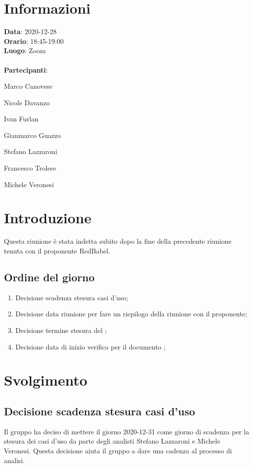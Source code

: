 \section{Informazioni}
\textbf{Data}: 2020-12-28\\
\textbf{Orario}: 18:45-19:00\\
\textbf{Luogo}: Zoom\\\\
\textbf{Partecipanti}:\begin{list}{*}{\setlength{\itemsep}{0cm}}
	\item Marco Canovese
	\item Nicole Davanzo
	\item Ivan Furlan
	\item Gianmarco Guazzo
	\item Stefano Lazzaroni
	\item Francesco Trolese
	\item Michele Veronesi
\end{list}

\section{Introduzione}
Questa riunione è stata indetta subito dopo la fine della precedente riunione tenuta con il proponente RedBabel.

\subsection{Ordine del giorno}
\begin{enumerate}
    \item Decisione scadenza stesura casi d'uso;
    \item Decisione data riunione per fare un riepilogo della riunione con il proponente;
    \item Decisione termine stesura del ;
    \item Decisione data di inizio verifica per il documento ;
\end{enumerate}

\section{Svolgimento}
\subsection{Decisione scadenza stesura casi d'uso} 
Il gruppo ha deciso di mettere il giorno 2020-12-31 come giorno di scadenza per la stesura dei casi d'uso da parte degli analisti Stefano Lazzaroni e Michele Veronesi. Questa decisione aiuta il gruppo a dare una cadenza al processo di analisi. 

